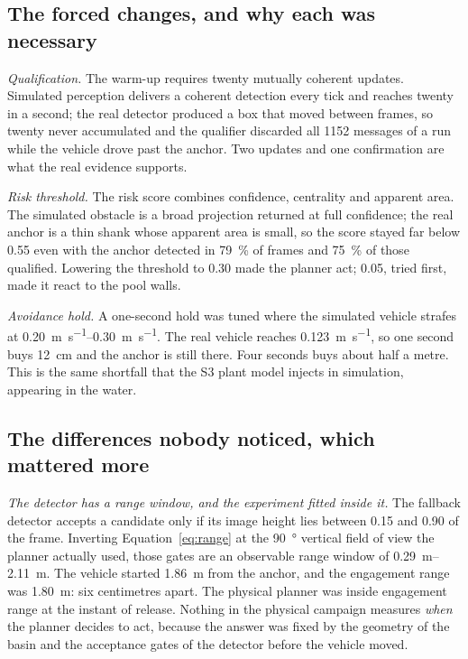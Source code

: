 \subsection{The forced changes, and why each was necessary}

\emph{Qualification.} The warm-up requires twenty mutually coherent
updates. Simulated perception delivers a coherent detection every tick
and reaches twenty in a second; the real detector produced a box that
moved between frames, so twenty never accumulated and the qualifier
discarded all 1152 messages of a run while the vehicle drove past the
anchor. Two updates and one confirmation are what the real evidence
supports.

\emph{Risk threshold.} The risk score combines confidence, centrality and
apparent area. The simulated obstacle is a broad projection returned at
full confidence; the real anchor is a thin shank whose apparent area is
small, so the score stayed far below \num{0.55} even with the anchor
detected in \SI{79}{\percent} of frames and \SI{75}{\percent} of those
qualified. Lowering the threshold to \num{0.30} made the planner act;
\num{0.05}, tried first, made it react to the pool walls.

\emph{Avoidance hold.} A one-second hold was tuned where the simulated
vehicle strafes at \SIrange{0.20}{0.30}{\metre\per\second}. The real
vehicle reaches \SI{0.123}{\metre\per\second}, so one second buys
\SI{12}{\centi\metre} and the anchor is still there. Four seconds buys
about half a metre. This is the same shortfall that the S3 plant model
injects in simulation, appearing in the water.

\subsection{The differences nobody noticed, which mattered more}

\emph{The detector has a range window, and the experiment fitted inside
it.} The fallback detector accepts a candidate only if its image height
lies between \num{0.15} and \num{0.90} of the frame. Inverting
Equation~\ref{eq:range} at the \SI{90}{\degree} vertical field of view
the planner actually used, those gates are an observable range window of
\SIrange{0.29}{2.11}{\metre}. The vehicle started \SI{1.86}{\metre} from
the anchor, and the engagement range was \SI{1.80}{\metre}: six
centimetres apart. The physical planner was inside engagement range at
the instant of release. Nothing in the physical campaign measures
\emph{when} the planner decides to act, because the answer was fixed by
the geometry of the basin and the acceptance gates of the detector
before the vehicle moved.


